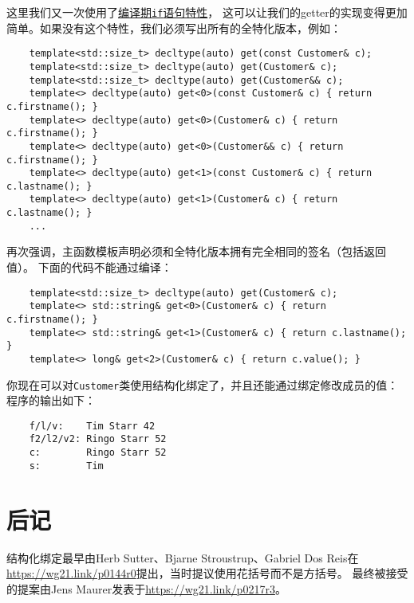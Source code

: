 这里我们又一次使用了\hyperref[ch10]{编译期\texttt{if}语句特性}，
这可以让我们的getter的实现变得更加简单。如果没有这个特性，我们必须写出所有的全特化版本，例如：
\begin{lstlisting}
    template<std::size_t> decltype(auto) get(const Customer& c);
    template<std::size_t> decltype(auto) get(Customer& c);
    template<std::size_t> decltype(auto) get(Customer&& c);
    template<> decltype(auto) get<0>(const Customer& c) { return c.firstname(); }
    template<> decltype(auto) get<0>(Customer& c) { return c.firstname(); }
    template<> decltype(auto) get<0>(Customer&& c) { return c.firstname(); }
    template<> decltype(auto) get<1>(const Customer& c) { return c.lastname(); }
    template<> decltype(auto) get<1>(Customer& c) { return c.lastname(); }
    ...
\end{lstlisting}
再次强调，主函数模板声明必须和全特化版本拥有完全相同的签名（包括返回值）。
下面的代码不能通过编译：
\begin{lstlisting}
    template<std::size_t> decltype(auto) get(Customer& c);
    template<> std::string& get<0>(Customer& c) { return c.firstname(); }
    template<> std::string& get<1>(Customer& c) { return c.lastname(); }
    template<> long& get<2>(Customer& c) { return c.value(); }
\end{lstlisting}
你现在可以对\texttt{Customer}类使用结构化绑定了，并且还能通过绑定修改成员的值：
程序的输出如下：
\begin{lstlisting}
    f/l/v:    Tim Starr 42
    f2/l2/v2: Ringo Starr 52
    c:        Ringo Starr 52
    s:        Tim
\end{lstlisting}

\section{后记}
结构化绑定最早由Herb Sutter、Bjarne Stroustrup、Gabriel Dos Reis在
\url{https://wg21.link/p0144r0}提出，当时提议使用花括号而不是方括号。
最终被接受的提案由Jens Maurer发表于\url{https://wg21.link/p0217r3}。